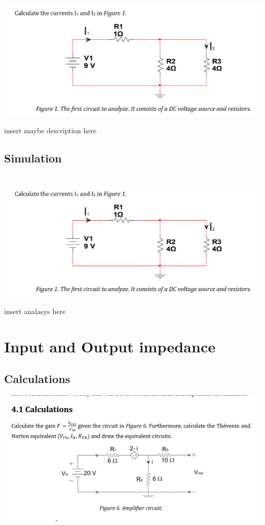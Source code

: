 \documentclass[11pt]{article}
\begin{document}
\noindent
\\
\includegraphics[width=\linewidth]{1.1 calculation.png}

insert maybe description here

\subsection[25pt]{\bf{Simulation}}

\noindent
\\
\includegraphics[width=\linewidth]{1.1 calculation.png}

insert analasys here


\section{\bf{Input and Output impedance}}

\subsection[25pt]{\bf{Calculations}}

\includegraphics[width=\linewidth]{4.1 calculations.png}
\end{document}
